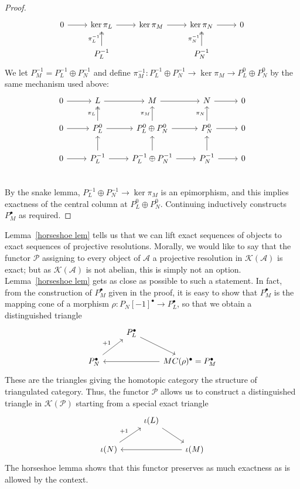 \begin{proof}
\[\begin{tikzcd}
0\ar[r]&\ker\pi_L\ar[r]&\ker\pi_M\ar[r]&\ker\pi_N\ar[r]&0\\
&P_L^{-1}\ar[u,two heads,"\pi^{-1}_L"]&&P_N^{-1}\ar[u,two heads,"\pi^{-1}_N"]
\end{tikzcd}\]
We let $P_M^{-1}=P^{-1}_L\oplus P_N^{-1}$ and define $\pi^{-1}_M:P^{-1}_L\oplus P_N^{-1}\to\ker\pi_M\to P^{0}_L\oplus P_N^{0}$ by the same mechanism used above:
\[\begin{tikzcd}
0\ar[r]&L\ar[r]&M\ar[r]&N\ar[r]&0\\
0\ar[r]&P^0_L\ar[u,two heads,"\pi_L"]\ar[r]&P^0_L\oplus P^0_N\ar[u,"\pi_M"]\ar[r]&P^0_N\ar[u,"\pi_N"]\ar[r]&0\\
0\ar[r]&P^{-1}_L\ar[u]\ar[r]&P^{-1}_L\oplus P^{-1}_N\ar[u,]\ar[r]&P^{-1}_N\ar[u]\ar[r]&0\\
\end{tikzcd}\]
By the snake lemma, $P^{-1}_L\oplus P^{-1}_N\to\ker\pi_M$ is an epimorphism, and this implies
exactness of the central column at $P^0_L\oplus P^0_N$. Continuing inductively constructs $P_M^\bullet$ as required.
\end{proof}
Lemma~\ref{horseshoe lem} tells us that we can lift exact sequences of objects to exact sequences
of projective resolutions. Morally, we would like to say that the functor $\mathscr{P}$ assigning
to every object of $\mathcal{A}$ a projective resolution in $\mathcal{K}(\mathcal{A})$ is exact; but as $\mathcal{K}(\mathcal{A})$ is not abelian, this is simply not an option. Lemma~\ref{horseshoe lem} gets as close as possible to such a statement. In fact, from the construction of $P_M^\bullet$ given in the proof, it is easy to show that $P_M^\bullet$ is the mapping cone of a morphism $\rho:P_N[-1]^\bullet\to P^\bullet_L$, so that we obtain a distinguished triangle
\[\begin{tikzcd}
&P_L^\bullet\ar[rd]&\\
P^\bullet_N\ar[ru,"+1"]&&MC(\rho)^\bullet=P^\bullet_M\ar[ll]
\end{tikzcd}\]
These are the triangles giving the homotopic category the structure of triangulated category. Thus, the functor $\mathscr{P}$ allows us to construct a distinguished triangle in $\mathcal{K}(\mathcal{P})$ starting from a special exact triangle
\[\begin{tikzcd}
&\iota(L)\ar[rd]&\\
\iota(N)\ar[ru,"+1"]&&\iota(M)\ar[ll]
\end{tikzcd}\]
The horseshoe lemma shows that this functor preserves as much exactness as is allowed by the context.\par
